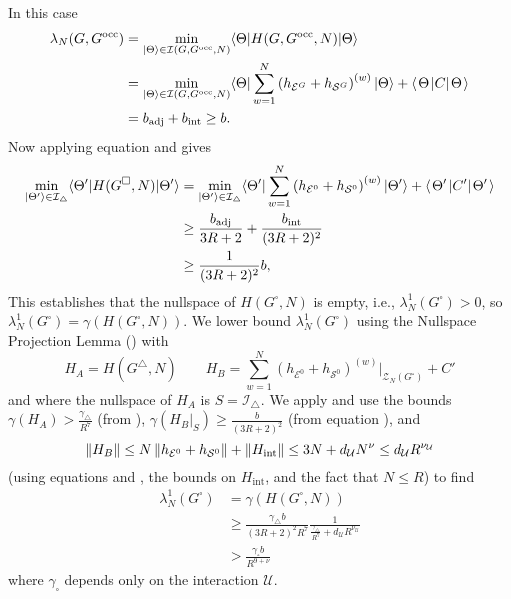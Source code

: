 \documentclass[../thesis-main/thesis-main]{subfiles}
\begin{document}
In this case 
\begin{align}
\lambda_{N}(G,G^{\text{occ}})&=\min_{|\Theta\rangle\in\mathcal{I}(G,G^{\text{occ}},N)}\langle\Theta|H(G,G^{\text{occ}},N)|\Theta\rangle\\
   & = \min_{|\Theta\rangle\in\mathcal{I}(G,G^{\text{occ}},N)}\langle\Theta|\sum_{w=1}^{N}\left(h_{\mathcal{E}^{G}}+h_{\mathcal{S}^{G}}\right)^{(w)}|\Theta\rangle + \langle\mspace{2mu} \Theta \mspace{2mu} | C |\mspace{2mu} \Theta \mspace{2mu} \rangle\\
   &= b_{\text{adj}} + b_{\text{int}} \geq  b.
\end{align}
 Now applying equation  and  gives
\begin{align}
  \min_{|\Theta^{\prime}\rangle\in\mathcal{I}_{\triangle}}\langle\Theta^{\prime}|H(G^{\square},N)|\Theta^{\prime}\rangle&=\min_{|\Theta^{\prime}\rangle\in\mathcal{I}_{\triangle}}\langle\Theta^{\prime}|\sum_{w=1}^{N}\left(h_{\mathcal{E}^{0}}+h_{\mathcal{S}^{0}}\right)^{(w)}|\Theta^{\prime}\rangle + \langle\mspace{2mu} \Theta' \mspace{2mu} | C' |\mspace{2mu} \Theta' \mspace{2mu} \rangle\\
  &\geq \frac{b_{\text{adj}}}{3R+2} + \frac{b_{\text{int}}}{(3R+2)^2}\\
  &\geq\frac{1}{(3R+2)^2}b,\label{eq:bound_thetaprime}
\end{align}
This establishes that the nullspace of $H(G^{\square},N)$ is empty, i.e., $\lambda_{N}^{1}(G^{\square})>0$, so $\lambda_{N}^{1}(G^{\square})=\gamma(H(G^{\square},N))$. We lower bound $\lambda_{N}^{1}(G^{\square})$ using the Nullspace Projection Lemma () with
\begin{equation}
  H_{A}=H(G^{\triangle},N)\qquad H_{B}=\sum_{w=1}^{N}\left(h_{\mathcal{E}^{0}}+h_{\mathcal{S}^{0}}\right)^{(w)}\bigg|_{\mathcal{Z}_{N}(G^{\square})} + C'
\end{equation}
and where the nullspace of $H_{A}$ is $S=\mathcal{I}_{\triangle}$. We apply  and use the bounds $\gamma(H_{A})>\frac{\gamma_\triangle}{R^{7}}$ (from ), $\gamma(H_{B}|_{S})\geq\frac{b}{(3R+2)^2}$ (from equation ), and 
\begin{equation}
  \left\Vert H_{B}\right\Vert \leq N\left\Vert {h_{\mathcal{E}^{0}}+h_{\mathcal{S}^{0}}}\right\Vert  + \|{H_{\text{int}}}\| \leq3N + d_{\mathcal{U}} N^{\nu}
  \leq d_{\mathcal{U}}R^{\nu_\mathcal{U}}
\end{equation}
(using equations  and , the bounds on $H_{\text{int}}$, and the fact that $N\leq R$) to find 
\begin{align}
\lambda_{N}^{1}(G^{\square}) &= \gamma(H(G^{\square},N)) \\
 &\geq \frac{\gamma_{\triangle}b}{(3R+2)^2R^7}\frac{1}{\frac{\gamma_{\triangle}}{R^7}+d_{\mathcal{U}} R^{\nu_{\mathcal{U}}}} \\
 & >\frac{ \gamma_{\square} b}{R^{9+\nu}}
\end{align}
where $\gamma_{\square}$ depends only on the interaction $\mathcal{U}$.
\end{document}
